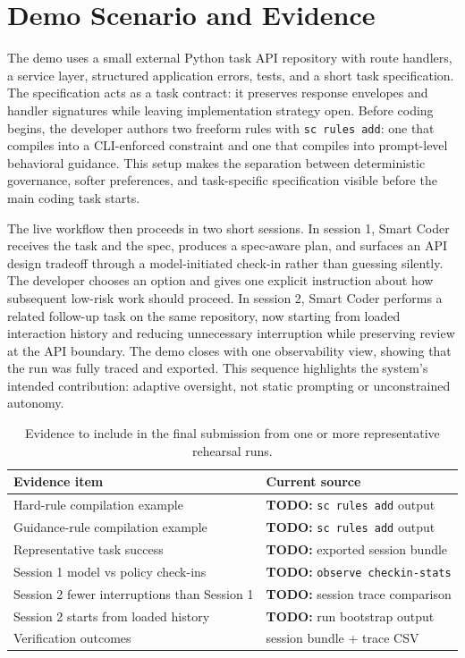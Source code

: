\section{Demo Scenario and Evidence}

The demo uses a small external Python task API repository with route handlers, a service layer, structured application errors, tests, and a short task specification. The specification acts as a task contract: it preserves response envelopes and handler signatures while leaving implementation strategy open. Before coding begins, the developer authors two freeform rules with \texttt{sc rules add}: one that compiles into a CLI-enforced constraint and one that compiles into prompt-level behavioral guidance. This setup makes the separation between deterministic governance, softer preferences, and task-specific specification visible before the main coding task starts.

The live workflow then proceeds in two short sessions. In session 1, Smart Coder receives the task and the spec, produces a spec-aware plan, and surfaces an API design tradeoff through a model-initiated check-in rather than guessing silently. The developer chooses an option and gives one explicit instruction about how subsequent low-risk work should proceed. In session 2, Smart Coder performs a related follow-up task on the same repository, now starting from loaded interaction history and reducing unnecessary interruption while preserving review at the API boundary. The demo closes with one observability view, showing that the run was fully traced and exported. This sequence highlights the system's intended contribution: adaptive oversight, not static prompting or unconstrained autonomy.

\begin{table}[t]
  \caption{Evidence to include in the final submission from one or more representative rehearsal runs.}
  \label{tab:evidence}
  \centering
  \begin{tabular}{p{}p{}}
    \toprule
    Evidence item & Current source \\
    \midrule
    Hard-rule compilation example & \textbf{TODO:} \texttt{sc rules add} output \\
    Guidance-rule compilation example & \textbf{TODO:} \texttt{sc rules add} output \\
    Representative task success & \textbf{TODO:} exported session bundle \\
    Session 1 model vs policy check-ins & \textbf{TODO:} \texttt{observe checkin-stats} \\
    Session 2 fewer interruptions than Session 1 & \textbf{TODO:} session trace comparison \\
    Session 2 starts from loaded history & \textbf{TODO:} run bootstrap output \\
    Verification outcomes & session bundle + trace CSV \\
    \bottomrule
  \end{tabular}
\end{table}

